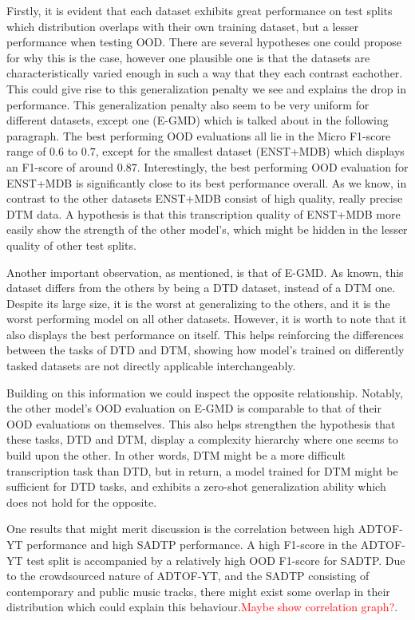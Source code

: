 Firstly, it is evident that each dataset exhibits great performance on test splits which distribution overlaps with their own training dataset, but a lesser performance when testing \gls{OOD}. There are several hypotheses one could propose for why this is the case, however one plausible one is that the datasets are characteristically varied enough in such a way that they each contrast eachother. This could give rise to this generalization penalty we see and explains the drop in performance. This generalization penalty also seem to be very uniform for different datasets, except one (E-GMD) which is talked about in the following paragraph. The best performing \gls{OOD} evaluations all lie in the Micro F1-score range of $0.6$ to $0.7$, except for the smallest dataset (ENST+MDB) which displays an F1-score of around $0.87$. Interestingly, the best performing \gls{OOD} evaluation for ENST+MDB is significantly close to its best performance overall. As we know, in contrast to the other datasets ENST+MDB consist of high quality, really precise \gls{DTM} data. A hypothesis is that this transcription quality of ENST+MDB more easily show the strength of the other model's, which might be hidden in the lesser quality of other test splits.

Another important observation, as mentioned, is that of E-GMD. As known, this dataset differs from the others by being a \acrfull{DTD} dataset, instead of a \gls{DTM} one. Despite its large size, it is the worst at generalizing to the others, and it is the worst performing model on all other datasets. However, it is worth to note that it also displays the best performance on itself. This helps reinforcing the differences between the tasks of \gls{DTD} and \gls{DTM}, showing how model's trained on differently tasked datasets are not directly applicable interchangeably. 

Building on this information we could inspect the opposite relationship. Notably, the other model's \gls{OOD} evaluation on E-GMD is comparable to that of their \gls{OOD} evaluations on themselves. This also helps strengthen the hypothesis that these tasks, \gls{DTD} and \gls{DTM}, display a complexity hierarchy where one seems to build upon the other. In other words, \gls{DTM} might be a more difficult transcription task than \gls{DTD}, but in return, a model trained for \gls{DTM} might be sufficient for \gls{DTD} tasks, and exhibits a zero-shot generalization ability which does not hold for the opposite.

One results that might merit discussion is the correlation between high ADTOF-YT performance and high SADTP performance. A high F1-score in the ADTOF-YT test split is accompanied by a relatively high \gls{OOD} F1-score for SADTP. Due to the crowdsourced nature of ADTOF-YT, and the SADTP consisting of contemporary and public music tracks, there might exist some overlap in their distribution which could explain this behaviour.\textcolor{red}{Maybe show correlation graph?}.

